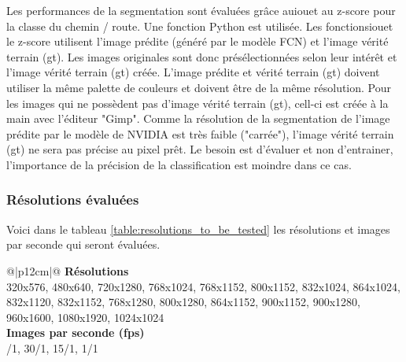 \par Les performances de la segmentation sont évaluées grâce au\acrshort{iou}et au z-score pour la classe du chemin / route. Une fonction Python est utilisée. Les fonctions\acrshort{iou}et le z-score utilisent l'image prédite (généré par le modèle FCN) et l'image vérité terrain (\acrshort{gt}). Les images originales sont donc présélectionnées selon leur intérêt et l'image vérité terrain (\acrshort{gt}) créée. L'image prédite et vérité terrain (\acrshort{gt}) doivent utiliser la même palette de couleurs et doivent être de la même résolution. Pour les images qui ne possèdent pas d'image vérité terrain (\acrshort{gt}), cell-ci est créée à la main avec l'éditeur "Gimp". Comme la résolution de la segmentation de l'image prédite par le modèle de NVIDIA est très faible ("carrée"), l'image vérité terrain (\acrshort{gt}) ne sera pas précise au pixel prêt. Le besoin est d'évaluer et non d'entrainer, l'importance de la précision de la classification est moindre dans ce cas. 
\subsubsection{Résolutions évaluées}\label{section:resolutions_to_be_tested}
Voici dans le tableau \ref{table:resolutions_to_be_tested} les résolutions et images par seconde qui seront évaluées. 
{
    \renewcommand*{\arraystretch}{1.4}
    \begin{table}[ht]
    \centering
    \caption{Résolutions et images par seconde (\acrshort{fps}) à tester}\label{table:resolutions_to_be_tested}
    \vspace{0.3em} %
    \begin{tabular}{{@{}|p{12cm}|@{}}}
         \hline
         \textbf{Résolutions}\\
         \hline
        320x576, 480x640, 720x1280, 768x1024, 768x1152, 800x1152, 832x1024, 864x1024, 832x1120, 832x1152, 768x1280, 800x1280, 864x1152, 900x1152, 900x1280, 960x1600, 1080x1920, 1024x1024\\
        \hline
        \textbf{Images par seconde (\acrshort{fps}) }\\
        /1, 30/1, 15/1, 1/1\\
        \hline
    \end{tabular}
    \end{table}
}